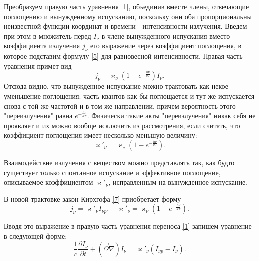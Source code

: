 Преобразуем правую часть уравнения \eqref{1}, объединив вместе члены, отвечающие поглощению и вынужденному испусканию, поскольку они оба пропорциональны неизвестной функции координат и времени - интенсивности излучения. Введем при этом в множитель перед $I_{\nu}$ в члене вынужденного испускания вместо коэффициента излучения $j_{\nu}$ его выражение через коэффициент поглощения, в которое подставим формулу \eqref{5} для равновесной интенсивности. Правая часть уравнения примет вид 
\begin {equation}
j_{\nu} - \varkappa_{\nu}(1 - e^{-\frac{h\nu}{kT}})I_{\nu}.
\end {equation}
Отсюда видно, что вынужденное испускание можно трактовать как некое уменьшение поглощения: часть квантов как бы поглощается и тут же испускается снова с той же частотой и в том же направлении, причем вероятность этого "переизлучения" равна $e^{-\frac{h\nu}{kT}}$. Физически такие акты "переизлучения" никак себя не проявляет и их можно вообще исключить из рассмотрения, если считать, что коэффициент поглощения имеет несколько меньшую величину:
\begin {equation}
\varkappa'_{\nu} = \varkappa_{\nu}(1 - e^{-\frac{h\nu}{kT}}).
\end {equation}

Взаимодействие излучения с веществом можно представлять так, как будто существует только спонтанное испускание и эффективное поглощение, описываемое коэффициентом $\varkappa'_{\nu}$, исправленным на вынужденное испускание.

В новой трактовке закон Кирхгофа \eqref{7} приобретает форму
\begin {equation}
j_{\nu} = \varkappa'_{\nu}I_{\nu p}, \quad \varkappa'_{\nu} = \varkappa_{\nu}(1 - e^{-\frac{h\nu}{kT}}).
\end {equation}

Вводя это выражение в правую часть уравнения переноса \eqref{1} запишем уравнение в следующей форме:
\begin {equation}
\frac{1}{c}\frac{\partial I_{\nu}}{\partial t} + (\vec\Omega \nabla) I_{\nu} = \varkappa'_{\nu} (I_{\nu p} - I_{\nu}).
\label{2}
\end {equation}
